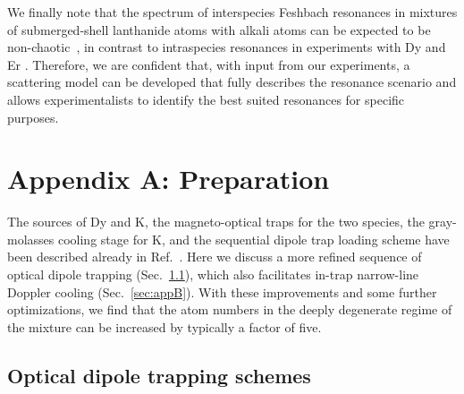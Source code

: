 We finally note that the spectrum of interspecies Feshbach resonances in mixtures of submerged-shell lanthanide atoms with alkali atoms can be expected to be non-chaotic~\cite{Gonzalezmartinez2015mtf}, in contrast to intraspecies resonances in experiments with Dy and Er \cite{Maier2015eoc}. Therefore, we are confident that, with input from our experiments, a scattering model can be developed that fully describes the resonance scenario and allows experimentalists to identify the best suited resonances for specific purposes.

	
	


\section{Appendix A: Preparation} \label{app:preparation}

The sources of Dy and K, the magneto-optical traps for the two species, the gray-molasses cooling stage for K, and the sequential dipole trap loading scheme have been described already in Ref.~\cite{Ravensbergen2018poa}. Here we discuss a more refined sequence of optical dipole trapping (Sec.~\ref{sec:appA}), which also facilitates in-trap narrow-line Doppler cooling (Sec.~\ref{sec:appB}). With these improvements and some further optimizations, we find that the atom numbers in the deeply degenerate regime of the mixture can be increased by typically a factor of five.

\subsection{Optical dipole trapping schemes}\label{sec:appA}

